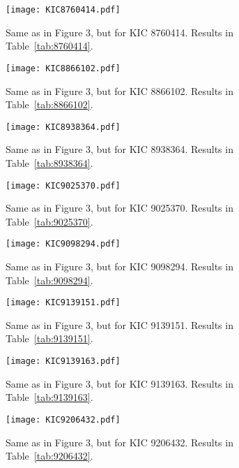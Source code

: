 \documentclass[twocolumn]{aastex61}%
\begin{document}
\begin{figure}[ht]
\texttt{[image: KIC8760414.pdf]}\vspace{-0.2cm}
\caption{Same as in Figure 3, but for KIC 8760414. Results in Table~\ref{tab:8760414}.}\label{fig:8760414}
\end{figure}

\begin{figure}[ht]
\texttt{[image: KIC8866102.pdf]}\vspace{-0.2cm}
\caption{Same as in Figure 3, but for KIC 8866102. Results in Table~\ref{tab:8866102}.}\label{fig:8866102}\vspace{-1cm}
\end{figure}

\begin{figure}[ht]
\texttt{[image: KIC8938364.pdf]}
\caption{Same as in Figure 3, but for KIC 8938364. Results in Table~\ref{tab:8938364}.}\label{fig:8938364}
\end{figure}

\begin{figure}[ht]
\texttt{[image: KIC9025370.pdf]}
\caption{Same as in Figure 3, but for KIC 9025370. Results in Table~\ref{tab:9025370}.}\label{fig:9025370}
\end{figure}

\begin{figure}[ht]
\texttt{[image: KIC9098294.pdf]}
\caption{Same as in Figure 3, but for KIC 9098294. Results in Table~\ref{tab:9098294}.}\label{fig:9098294}
\end{figure}

\FloatBarrier
\nopagebreak
\begin{figure}[ht]
\texttt{[image: KIC9139151.pdf]}
\caption{Same as in Figure 3, but for KIC 9139151. Results in Table~\ref{tab:9139151}.}\label{fig:9139151}
\end{figure}

\begin{figure}[ht]
\texttt{[image: KIC9139163.pdf]}
\caption{Same as in Figure 3, but for KIC 9139163. Results in Table~\ref{tab:9139163}.}\label{fig:9139163}
\end{figure}

\begin{figure}[ht]
\texttt{[image: KIC9206432.pdf]}
\caption{Same as in Figure 3, but for KIC 9206432. Results in Table~\ref{tab:9206432}.}\label{fig:9206432}
\end{figure}
\end{document}
